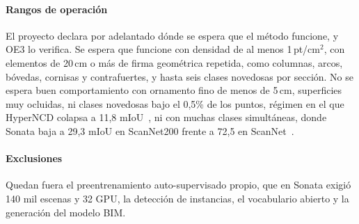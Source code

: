 \paragraph*{Rangos de operación}
El proyecto declara por adelantado dónde se espera que el método funcione, y OE3
lo verifica. Se espera que funcione con densidad de al menos 1\,pt/cm$^2$, con
elementos de 20\,cm o más de firma geométrica repetida, como columnas, arcos,
bóvedas, cornisas y contrafuertes, y hasta seis clases novedosas por sección. No
se espera buen comportamiento con ornamento fino de menos de 5\,cm, superficies
muy ocluidas, ni clases novedosas bajo el 0,5\% de los puntos, régimen en el que
HyperNCD colapsa a 11,8 mIoU~\cite{zhang2026hyperncd}, ni con muchas clases simultáneas,
donde Sonata baja a 29,3 mIoU en ScanNet200 frente a 72,5 en
ScanNet~\cite{wu2025sonata}.

\paragraph*{Exclusiones}
Quedan fuera el preentrenamiento auto-supervisado propio, que en Sonata exigió
140 mil escenas y 32 GPU, la detección de instancias, el vocabulario abierto y la
generación del modelo BIM.

\renewcommand{\thetable}{\arabic{chapter}.\arabic{table}}
\setcounter{table}{0}

